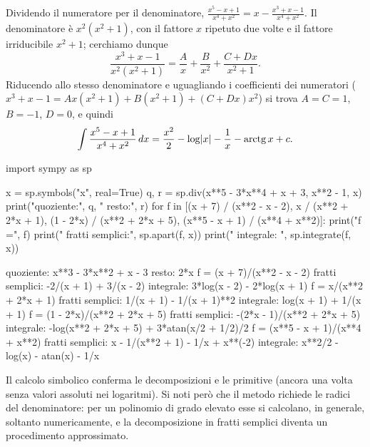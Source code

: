 \begin{esempio}\label{es:quarto-grado}
Dividendo il numeratore per il denominatore,
$\frac{x^{5}-x+1}{x^{4}+x^{2}}=x-\frac{x^{3}+x-1}{x^{4}+x^{2}}$. Il denominatore è
$x^{2}(x^{2}+1)$, con il fattore $x$ ripetuto due volte e il fattore irriducibile $x^{2}+1$;
cerchiamo dunque
\[
  \frac{x^{3}+x-1}{x^{2}(x^{2}+1)}=\frac Ax+\frac B{x^{2}}+\frac{C+Dx}{x^{2}+1} .
\]
Riducendo allo stesso denominatore e uguagliando i coefficienti dei numeratori
($x^{3}+x-1=Ax(x^{2}+1)+B(x^{2}+1)+(C+Dx)x^{2}$) si trova $A=C=1$, $B=-1$, $D=0$, e quindi
\[
  \int\frac{x^{5}-x+1}{x^{4}+x^{2}}\,dx=\frac{x^{2}}2-\log\lvert x\rvert-\frac1x-\operatorname{arctg}x+c .
\]
\end{esempio}

\begin{python}
import sympy as sp

x = sp.symbols("x", real=True)
q, r = sp.div(x**5 - 3*x**4 + x + 3, x**2 - 1, x)
print("quoziente:", q, "   resto:", r)
for f in [(x + 7) / (x**2 - x - 2), x / (x**2 + 2*x + 1),
          (1 - 2*x) / (x**2 + 2*x + 5),
          (x**5 - x + 1) / (x**4 + x**2)]:
    print("f =", f)
    print("    fratti semplici:", sp.apart(f, x))
    print("    integrale:      ", sp.integrate(f, x))
\end{python}
\begin{risultato}
quoziente: x**3 - 3*x**2 + x - 3    resto: 2*x
f = (x + 7)/(x**2 - x - 2)
    fratti semplici: -2/(x + 1) + 3/(x - 2)
    integrale:       3*log(x - 2) - 2*log(x + 1)
f = x/(x**2 + 2*x + 1)
    fratti semplici: 1/(x + 1) - 1/(x + 1)**2
    integrale:       log(x + 1) + 1/(x + 1)
f = (1 - 2*x)/(x**2 + 2*x + 5)
    fratti semplici: -(2*x - 1)/(x**2 + 2*x + 5)
    integrale:       -log(x**2 + 2*x + 5) + 3*atan(x/2 + 1/2)/2
f = (x**5 - x + 1)/(x**4 + x**2)
    fratti semplici: x - 1/(x**2 + 1) - 1/x + x**(-2)
    integrale:       x**2/2 - log(x) - atan(x) - 1/x
\end{risultato}

Il calcolo simbolico conferma le decomposizioni e le primitive (ancora una volta senza
valori assoluti nei logaritmi). Si noti però che il metodo richiede le radici del
denominatore: per un polinomio di grado elevato esse si calcolano, in generale, soltanto
numericamente, e la decomposizione in fratti semplici diventa un procedimento
approssimato.


